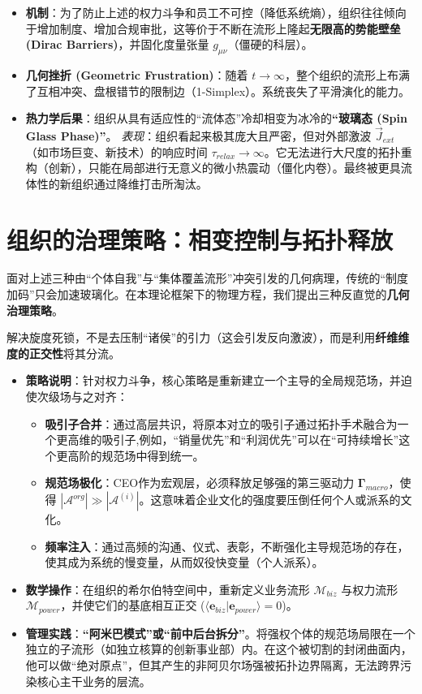 \begin{itemize}
    \item \textbf{机制}：为了防止上述的权力斗争和员工不可控（降低系统熵），组织往往倾向于增加制度、增加合规审批，这等价于不断在流形上隆起\textbf{无限高的势能壁垒 (Dirac Barriers)}，并固化度量张量 $g_{\mu\nu}$（僵硬的科层）。
    \item \textbf{几何挫折 (Geometric Frustration)}：随着 $t \to \infty$，整个组织的流形上布满了互相冲突、盘根错节的限制边（1-Simplex）。系统丧失了平滑演化的能力。
    \item \textbf{热力学后果}：组织从具有适应性的“流体态”冷却相变为冰冷的\textbf{“玻璃态 (Spin Glass Phase)”}。
    \textit{表现}：组织看起来极其庞大且严密，但对外部激波 $\vec{J}_{ext}$（如市场巨变、新技术）的响应时间 $\tau_{relax} \to \infty$。它无法进行大尺度的拓扑重构（创新），只能在局部进行无意义的微小热震动（僵化内卷）。最终被更具流体性的新组织通过降维打击所淘汰。
\end{itemize}

\section{组织的治理策略：相变控制与拓扑释放}
\label{sec:org_governance_strategies}

面对上述三种由“个体自我”与“集体覆盖流形”冲突引发的几何病理，传统的“制度加码”只会加速玻璃化。在本理论框架下的物理方程，我们提出三种反直觉的\textbf{几何治理策略}。


解决旋度死锁，不是去压制“诸侯”的引力（这会引发反向激波），而是利用\textbf{纤维维度的正交性}将其分流。
\begin{itemize}
    \item \textbf{策略说明}：针对权力斗争，核心策略是重新建立一个主导的全局规范场，并迫使次级场与之对齐：
    \begin{itemize}
        \item \textbf{吸引子合并}：通过高层共识，将原本对立的吸引子通过拓扑手术融合为一个更高维的吸引子,例如，“销量优先”和“利润优先”可以在“可持续增长”这个更高阶的规范场中得到统一。
        \item \textbf{规范场极化}：CEO作为宏观层，必须释放足够强的第三驱动力 $\mathbf{\Gamma}_{macro}$，使得 $|\mathcal{A}^{org}| \gg |\mathcal{A}^{(i)}|$。这意味着企业文化的强度要压倒任何个人或派系的文化。
        \item \textbf{频率注入}：通过高频的沟通、仪式、表彰，不断强化主导规范场的存在，使其成为系统的慢变量，从而奴役快变量（个人派系）。
    \end{itemize}
    \item \textbf{数学操作}：在组织的希尔伯特空间中，重新定义业务流形 $\mathcal{M}_{biz}$ 与权力流形 $\mathcal{M}_{power}$，并使它们的基底相互正交 ($\langle \mathbf{e}_{biz} | \mathbf{e}_{power} \rangle = 0$)。
    \item \textbf{管理实践}：\textbf{“阿米巴模式”或“前中后台拆分”}。将强权个体的规范场局限在一个独立的子流形（如独立核算的创新事业部）内。在这个被切割的封闭曲面内，他可以做“绝对原点”，但其产生的非阿贝尔场强被拓扑边界隔离，无法跨界污染核心主干业务的层流。
\end{itemize}

